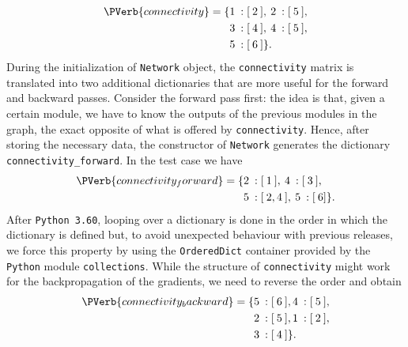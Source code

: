 \documentclass{article}
\begin{document}
\begin{align*}
\PVerb{connectivity} =  \{  & 1  \: :  [ \: 2 \: ], \: 2  \: : [ \: 5 \: ],\\
&  3  \: :  [ \: 4 \: ], \: 4  \: :  [ \: 5 \: ],\\
&  5  \: :  [ \: 6 \: ]  \}.
\end{align*}
During the initialization of \verb|Network| object, the \verb|connectivity| matrix is translated into two additional dictionaries that are more useful for the forward and backward passes. Consider the forward pass first: the idea is that, given a certain module, we have to know the outputs of the previous modules in the graph, the exact opposite of what is offered by \verb|connectivity|. Hence, after storing the necessary data, the constructor of \verb|Network| generates the dictionary \verb|connectivity_forward|. In the test case we have
\begin{align*}
\PVerb{connectivity_forward} =  \{  & 2  \: :  [ \: 1 \: ], \: 4  \: : [ \: 3 \: ],\\
&  5  \: :  [ \: 2 , 4 \: ], \: 5  \: :  [ \: 6 ] \}.
\end{align*} 
After \verb|Python 3.60|, looping over a dictionary is done in the order in which the dictionary is defined but, to avoid unexpected behaviour with previous releases, we force this property by using the \verb|OrderedDict| container provided by the \verb|Python| module \verb|collections|.
While the structure of \verb|connectivity| might work for the backpropagation of the gradients, we need to reverse the order and  obtain
\begin{align*}
\PVerb{connectivity_backward} =  \{  & 5  \: :  [ \: 6 \: ], 4  \: : [ \: 5 \: ],\\
&  2  \: :  [ \: 5 \: ], 1  \: :  [ \: 2 \: ],\\
&  3  \: :  [ \: 4 \: ]  \}.
\end{align*}
\end{document}
